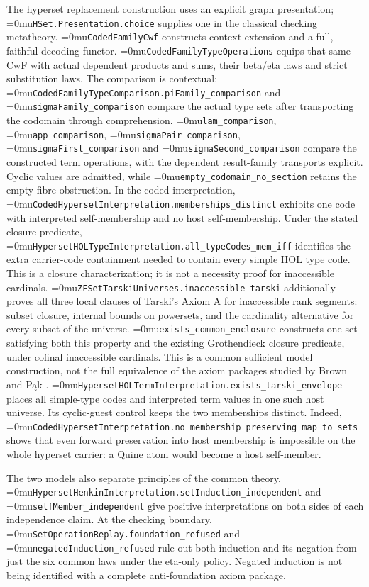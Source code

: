 \documentclass[11pt]{article}
\newcommand{\leanname}[1]{\textup{\Urlmuskip=0mu\relax\nolinkurl{#1}}}
\theoremstyle{definition}
\theoremstyle{remark}
\begin{document}
The hyperset replacement construction uses an explicit graph presentation;
\leanname{HSet.Presentation.choice} supplies one in the classical checking
metatheory. \leanname{CodedFamilyCwf} constructs context extension and a full,
faithful decoding functor. \leanname{CodedFamilyTypeOperations} equips that
same CwF with actual dependent products and sums, their beta/eta laws and
strict substitution laws. The comparison is contextual:
\leanname{CodedFamilyTypeComparison.piFamily_comparison} and
\leanname{sigmaFamily_comparison} compare the actual type sets after
transporting the codomain through comprehension.
\leanname{lam_comparison}, \leanname{app_comparison},
\leanname{sigmaPair_comparison}, \leanname{sigmaFirst_comparison} and
\leanname{sigmaSecond_comparison} compare the constructed term operations,
with the dependent result-family transports explicit. Cyclic values are
admitted, while \leanname{empty_codomain_no_section} retains the empty-fibre
obstruction. In the coded interpretation,
\leanname{CodedHypersetInterpretation.memberships_distinct} exhibits one code
with interpreted self-membership and no host self-membership. Under the
stated closure predicate, \leanname{HypersetHOLTypeInterpretation.all_typeCodes_mem_iff}
identifies the extra carrier-code containment needed to contain every simple
HOL type code. This is a closure characterization; it is not a necessity proof
for inaccessible cardinals.
\leanname{ZFSetTarskiUniverses.inaccessible_tarski} additionally proves all
three local clauses of Tarski's Axiom A for inaccessible rank segments:
subset closure, internal bounds on powersets, and the cardinality alternative
for every subset of the universe. \leanname{exists_common_enclosure} constructs
one set satisfying both this property and the existing Grothendieck closure
predicate, under cofinal inaccessible cardinals. This is a common sufficient
model construction, not the full equivalence of the axiom packages studied
by Brown and P\k{a}k \cite{BrownPakTwoSetTheories}.
\leanname{HypersetHOLTermInterpretation.exists_tarski_envelope} places all
simple-type codes and interpreted term values in one such host universe.
Its cyclic-guest control keeps the two memberships distinct. Indeed,
\leanname{CodedHypersetInterpretation.no_membership_preserving_map_to_sets}
shows that even forward preservation into host membership is impossible on
the whole hyperset carrier: a Quine atom would become a host self-member.

The two models also separate principles of the common theory.
\leanname{HypersetHenkinInterpretation.setInduction_independent} and
\leanname{selfMember_independent} give positive interpretations on both sides
of each independence claim. At the checking boundary,
\leanname{SetOperationReplay.foundation_refused} and
\leanname{negatedInduction_refused} rule out both induction and its negation
from just the six common laws under the eta-only policy. Negated induction
is not being identified with a complete anti-foundation axiom package.
\end{document}
